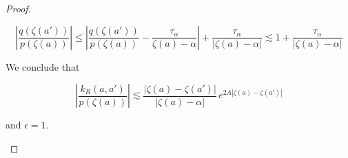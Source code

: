 \documentclass{article}
\theoremstyle{plain}
\newcommand{\volterra}{\mathcal{V}}
\newcommand{\hardpart}{\mathcal{V}_0}
\newcommand{\softpart}{\mathcal{V}_\star}
\begin{document}
\begin{proof}
\begin{enumerate}
\[    \left\vert \frac{q(\zeta(a'))}{p(\zeta(a))}\right\vert  \leq \left\vert \frac{q(\zeta(a'))}{p(\zeta(a))} -\frac{\tau_\alpha}{\zeta(a)-\alpha}\right\vert + \frac{\tau_\alpha}{|\zeta(a)-\alpha|}\lesssim 1 +  \frac{\tau_\alpha}{|\zeta(a)-\alpha|} \]

We conclude that 

\[\left\vert \frac{k_R(a,a')}{p(\zeta(a))}\right\vert \lesssim \frac{|\zeta(a)-\zeta(a')|}{|\zeta(a)-\alpha|}\, e^{2A |\zeta(a)-\zeta(a')|}  \]

and $\epsilon=1$.

\end{enumerate}



\end{proof}





\end{document}
